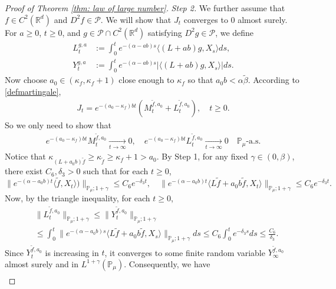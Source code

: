 \documentclass[12pt,a4paper]{amsart}
\theoremstyle{plain}
\theoremstyle{definition}
\numberwithin{equation}{section}
\begin{document}
\begin{proof}[Proof of Theorem \ref{thm: law of large number}]
\emph{Step 2.}
We further assume that $f\in C^2(\mathbb R^d)$ and $D^2f \in \mathcal{P}$.
We will show that $J_t$ converges to $0$ almost surely.
For $a \geq 0$, $ t\geq 0$, and $g\in \mathcal{P}\cap C^2(\mathbb{R}^d)$ satisfying $D^2g\in \mathcal{P}$, we define
\begin{align}
	L_t^{g,a}
  & :=\int_0^t e^{-(\alpha-ab)s}\langle (L+ab)g,X_s\rangle ds,\\
  Y_t^{g,a}
  & :=\int_0^t e^{-(\alpha-ab)s}|\langle (L+ab)g,X_s\rangle|ds.
\end{align}
Now choose $a_0 \in (\kappa_{f}, \kappa_f + 1)$ close enough to $\kappa_f$ so that $a_0 b < \alpha \tilde \beta$.
According to \eqref{defmartingale},
\begin{align}
  J_t
  = e^{-(a_0-\kappa_f)bt} (M_t^{\widetilde{f}, a_0}+L_t^{\widetilde{f}, a_0}),
  \quad t\geq 0.
\end{align}
So we only need to show that
\begin{align}
  e^{-(a_0-\kappa_f)b t}M_t^{\widetilde{f},a_0}
  \xrightarrow[t\to \infty]{} 0,
  \quad e^{-(a_0-\kappa_f)b t}L_t^{\widetilde{f},a_0}
  \xrightarrow[t\to \infty]{} 0
  \quad \mathbb{P}_{\mu}\text{-a.s.}
\end{align}
Notice that $\kappa_{(L+a_0 b)\widetilde{f}}\geq \kappa_{\widetilde{f}}\geq \kappa_f+1 > a_0$.
By Step 1, for any fixed $\gamma\in (0,\beta)$, there exist $C_6, \delta_3>0$ such that for each $t\geq 0$,
\begin{equation}
  \| e^{-(\alpha-a_0 b)t}\langle \widetilde{f},X_t\rangle)\|_{\mathbb{P}_{\mu};1+\gamma}
  \leq C_6 e^{-\delta_3 t},
  \quad \|e^{-(\alpha-a_0 b)t}\langle L\widetilde{f}+a_0 b\widetilde{f},X_t\rangle\|_{\mathbb{P}_{\mu};1+\gamma}
  \leq C_6 e^{-\delta_3 t}.
\end{equation}
Now, by the triangle inequality, for each $t\geq 0$,
\begin{align}
  & \|L_t^{\widetilde{f},a_0}\|_{\mathbb{P}_{\mu};1+\gamma}
    \leq\|Y_t^{\widetilde{f},a_0}\|_{\mathbb{P}_{\mu};1+\gamma} \\
  & \leq \int_0^t \|e^{-(\alpha-a_0 b)s}\langle L\widetilde{f}+a_0 b\widetilde{f},X_s\rangle\|_{\mathbb{P}_{\mu};1+\gamma}ds\leq C_6 \int_0^t e^{-\delta_3 s}ds\leq\frac{C_6}{\delta_3}.
\end{align}
Since $Y_t^{\widetilde{f},a_0}$ is increasing in $t$, it converges to some finite random variable $Y_{\infty}^{\widetilde{f},a_0}$ almost surely and in $L^{1+\gamma}(\mathbb{P}_{\mu})$.
Consequently,  we have
\begin{align}

\end{align}
\end{proof}
\end{document}
